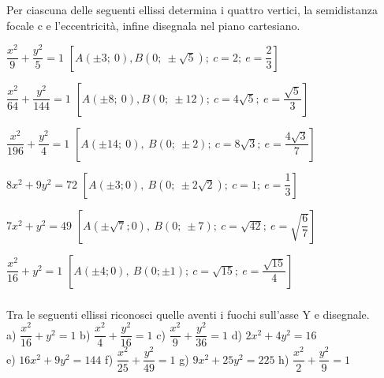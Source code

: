 \begin{esercizio}
  \label{ese:div.003}
  Per ciascuna delle seguenti ellissi determina i quattro vertici, la 
semidistanza focale c e l'eccentricità, infine disegnala nel piano 
cartesiano.
  \begin{enumeratea}
\item \( \dfrac{x^{2}}{9} + \dfrac{y^{2}}{5} =1\)  
\hfill \(\left[A(\pm3;~0), B\left(0; ~ \pm  \sqrt{5} \right); ~c=2 ;~ e= 
\dfrac{2}{3} \right]\)
\item \( \dfrac{x^{2}}{64} + \dfrac{y^{2}}{144} =1\)  
\hfill \(\left[A(\pm 8;~ 0), B(0; ~ \pm 12); ~c=4 \sqrt{5}  ;~ e= 
\dfrac{\sqrt{5}}{3} \right]\)

\item \( \dfrac{x^{2}}{196} + \dfrac{y^{2}}{4} =1\)
\hfill \(\left[A(\pm14;~ 0),~ B(0; ~ \pm 2);~ c=8 \sqrt{3}  ;~ e= 
\dfrac{4\sqrt{3}}{7} \right]\)

\item \(8{x^{2}}+9{y^{2}}=72\)
\hfill  \(\left[A(\pm3; 0),~ B\left(0;~ \pm 2 \sqrt{2} \right);~c=1; ~e= 
\dfrac{1}{3} \right]\)

\item \(7{x^{2}}+{y^{2}}=49\)
\hfill \(\left[A(\pm  \sqrt{7}; 0),~ B\left(0; ~ \pm 7\right);~ c= \sqrt{42} 
;~ e= \sqrt{\dfrac{6}{7}} \right]\)

\item \( \dfrac{x^{2}}{16} + y^{2} =1\)  
\hfill \(\left[A(\pm4; 0),~ B(0;  \pm 1);~ c= \sqrt{15}  ;~ e= 
\dfrac{\sqrt{15}}{4} \right]\)

  \end{enumeratea}
\end{esercizio}

\subsubsection*{}

\begin{esercizio}
  \label{ese:div.003}
   Tra le seguenti ellissi riconosci quelle aventi i fuochi sull'asse 
Y e disegnale. \\
a) \( \dfrac{x^{2}}{16} + y^{2} =1\)  \hspace{1.5cm} b) \( \dfrac{x^{2}}{4} + 
\dfrac{y^{2}}{16} =1\)\hspace{1.5cm}  c) \( \dfrac{x^{2}}{9} + 
\dfrac{y^{2}}{36} =1\)\hspace{1.45cm} d) \(2 x^{2} +4y^{2} =16\)\\
e) \(16 x^{2} +9 y^{2} =144\)  \hspace{0.7cm} f) \( \dfrac{x^{2}}{25} + 
\dfrac{y^{2}}{49} =1\)\hspace{1.6cm}  g) \(9 x^{2} +25 y^{2} =225\) 
\hspace{0.6cm} h) \( \dfrac{x^{2}}{2} + \dfrac{y^{2}}{9} =1\) 
\end{esercizio}

